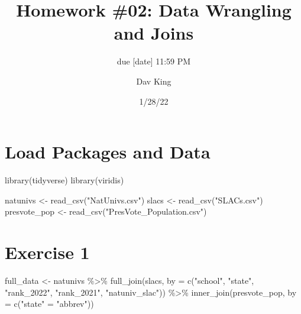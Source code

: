 \documentclass[
]{article}
\title{Homework \#02: Data Wrangling and Joins}
\subtitle{due {[}date{]} 11:59 PM}
\author{Dav King}
\date{1/28/22}
\newenvironment{Shaded}{\begin{snugshade}}{\end{snugshade}}
\newcommand{\AttributeTok}[1]{\textcolor[rgb]{0.77,0.63,0.00}{#1}}
\newcommand{\FunctionTok}[1]{\textcolor[rgb]{0.00,0.00,0.00}{#1}}
\newcommand{\NormalTok}[1]{#1}
\newcommand{\OtherTok}[1]{\textcolor[rgb]{0.56,0.35,0.01}{#1}}
\newcommand{\SpecialCharTok}[1]{\textcolor[rgb]{0.00,0.00,0.00}{#1}}
\newcommand{\StringTok}[1]{\textcolor[rgb]{0.31,0.60,0.02}{#1}}
\begin{document}
\maketitle

\hypertarget{load-packages-and-data}{%
\section{Load Packages and Data}\label{load-packages-and-data}}

\begin{Shaded}
\begin{Highlighting}[]
\FunctionTok{library}\NormalTok{(tidyverse)}
\FunctionTok{library}\NormalTok{(viridis)}
\end{Highlighting}
\end{Shaded}

\begin{Shaded}
\begin{Highlighting}[]
\NormalTok{natunivs }\OtherTok{\textless{}{-}} \FunctionTok{read\_csv}\NormalTok{(}\StringTok{"NatUnivs.csv"}\NormalTok{)}
\NormalTok{slacs }\OtherTok{\textless{}{-}} \FunctionTok{read\_csv}\NormalTok{(}\StringTok{"SLACs.csv"}\NormalTok{)}
\NormalTok{presvote\_pop }\OtherTok{\textless{}{-}} \FunctionTok{read\_csv}\NormalTok{(}\StringTok{"PresVote\_Population.csv"}\NormalTok{)}
\end{Highlighting}
\end{Shaded}

\hypertarget{exercise-1}{%
\section{Exercise 1}\label{exercise-1}}

\begin{Shaded}
\begin{Highlighting}[]
\NormalTok{full\_data }\OtherTok{\textless{}{-}}\NormalTok{ natunivs }\SpecialCharTok{\%\textgreater{}\%}
  \FunctionTok{full\_join}\NormalTok{(slacs, }\AttributeTok{by =} \FunctionTok{c}\NormalTok{(}\StringTok{"school"}\NormalTok{, }\StringTok{"state"}\NormalTok{,}
                             \StringTok{"rank\_2022"}\NormalTok{, }\StringTok{"rank\_2021"}\NormalTok{, }\StringTok{"natuniv\_slac"}\NormalTok{)) }\SpecialCharTok{\%\textgreater{}\%}
  \FunctionTok{inner\_join}\NormalTok{(presvote\_pop, }\AttributeTok{by =} \FunctionTok{c}\NormalTok{(}\StringTok{"state"} \OtherTok{=} \StringTok{"abbrev"}\NormalTok{))}
\end{Highlighting}
\end{Shaded}
\end{document}
